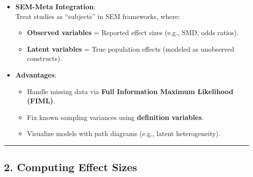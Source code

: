 \documentclass[
  letterpaper,
  DIV=11,
  numbers=noendperiod]{scrartcl}
\providecommand{\tightlist}{%
  \setlength{\itemsep}{0pt}\setlength{\parskip}{0pt}}\usepackage{longtable,booktabs,array}
\begin{document}
\begin{tcolorbox}[enhanced jigsaw, toptitle=1mm, colframe=quarto-callout-note-color-frame, left=2mm, colbacktitle=quarto-callout-note-color!10!white, opacitybacktitle=0.6, bottomtitle=1mm, bottomrule=.15mm, coltitle=black, titlerule=0mm, title=\textcolor{quarto-callout-note-color}{\faInfo}\hspace{0.5em}{Key Conceptual Foundations}, opacityback=0, toprule=.15mm, rightrule=.15mm, colback=white, breakable, arc=.35mm, leftrule=.75mm]

\begin{itemize}
\tightlist
\item
  \textbf{SEM-Meta Integration}:\\
  Treat studies as ``subjects'' in SEM frameworks, where:

  \begin{itemize}
  \tightlist
  \item
    \textbf{Observed variables} = Reported effect sizes (e.g., SMD, odds
    ratios).\\
  \item
    \textbf{Latent variables} = True population effects (modeled as
    unobserved constructs).\\
  \end{itemize}
\item
  \textbf{Advantages}:

  \begin{itemize}
  \tightlist
  \item
    Handle missing data via \textbf{Full Information Maximum Likelihood
    (FIML)}.\\
  \item
    Fix known sampling variances using \textbf{definition variables}.\\
  \item
    Visualize models with path diagrams (e.g., latent heterogeneity).
  \end{itemize}
\end{itemize}

\end{tcolorbox}

\begin{center}\rule{0.5\linewidth}{0.5pt}\end{center}

\subsection{\texorpdfstring{2. \textbf{Computing Effect
Sizes}}{2. Computing Effect Sizes}}\label{computing-effect-sizes}
\end{document}
